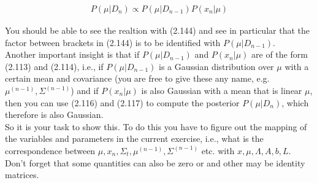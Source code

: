 \documentclass[a4paper]{article}
\begin{document}
\begin{align*}
	P(\mu | D_{n}) \propto P(\mu | D_{n - 1}) P(x_n | \mu)
\end{align*}

You should be able to see the realtion with (2.144) and see in particular that the factor between brackets in (2.144) is to be identified with $P(\mu | D_{n - 1})$.\\
Another important insight is that if $P(\mu | D_{n - 1})$ and $P(x_n | \mu)$ are of the form (2.113) and (2.114), i.e., if $P(\mu | D_{n - 1})$ is a Gaussian distribution over $\mu$ with a certain mean and covariance (you are free to give these any name, e.g. $\mu^{(n-1)}, \Sigma^{(n-1)}$) and if $P(x_n | \mu)$ is also Gaussian with a mean that is linear $\mu$, then you can use (2.116) and (2.117) to compute the posterior $P(\mu | D_n)$, which therefore is also Gaussian.\\
So it is your task to show this. To do this you have to figure out the mapping of the variables and parameters in the current exercise, i.e., what is the correspondence between $\mu, x_n, \Sigma_t, \mu^{(n-1)}, \Sigma^{(n-1)}$ etc. with $x, \mu, \Lambda, A, b, L$. Don't forget that some quantities can also be zero or and other may be identity matrices.
\end{document}
